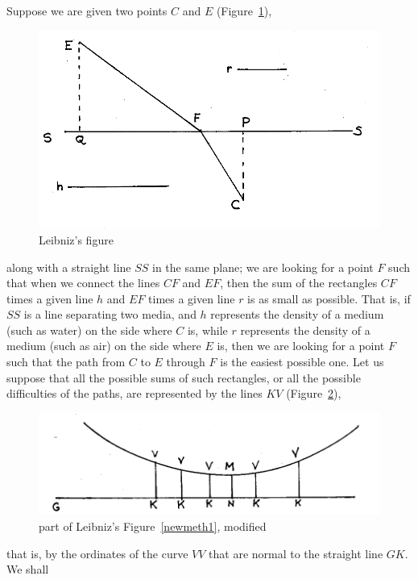 \documentclass[twoside,openright]{article}
\begin{document}
\label{bnmex2} Suppose we are given two points $C$ and $E$
(Figure~\ref{leasttime}),
\begin{figure}[htp]
  \begin{center}
    \includegraphics[width=.75\textwidth]{fig/Figure21}
    \caption{Leibniz's figure}
    \label{leasttime}
  \end{center}
\end{figure} along with a straight line $SS$ in the same plane; we are
looking for a point $F$ such that when we connect the lines $CF$ and
$EF$, then the sum of the rectangles $CF$ times a given line $h$ and
$EF$ times a given line $r$ is as small as possible.  That is, if $SS$
is a line separating two media, and $h$ represents the density of a
medium (such as water) on the side where $C$ is, while $r$ represents
the density of a medium (such as air) on the side where $E$ is, then
we are looking for a point $F$ such that the path from $C$ to $E$
through $F$ is the easiest possible one. Let us suppose that all the possible sums of
such rectangles, or all the possible difficulties of the paths, are
represented by the lines $KV$ (Figure~\ref{leasttime2}),
\begin{figure}[htp]
  \begin{center}
    \includegraphics[width=.75\textwidth]{fig/Figure22}
    \caption{part of Leibniz's Figure~\ref{newmeth1}, modified}
    \label{leasttime2}
  \end{center}
\end{figure}
that is, by the ordinates of the curve $VV$ that are normal to the
straight line $GK$. We shall
\end{document}
